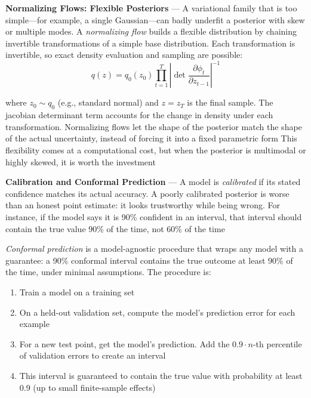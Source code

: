 \textbf{Normalizing Flows: Flexible Posteriors} --- A variational family that is
too simple—for example, a single Gaussian—can badly underfit a posterior with
skew or multiple modes. A \emph{normalizing flow} builds a flexible distribution
by chaining invertible transformations of a simple base distribution. Each transformation
is invertible, so exact density evaluation and sampling are possible:
\begin{equation}
  q(z) = q_{0}(z_{0}) \prod_{t=1}^{T}\left| \det \frac{\partial \phi_{t}}{\partial
  z_{t-1}}\right|^{-1}\label{eq:flow}
\end{equation}

where $z_{0}\sim q_{0}$ (e.g., standard normal) and $z = z_{T}$ is the final
sample. The jacobian determinant term accounts for the change in density under each
transformation. Normalizing flows let the shape of the posterior match the shape
of the actual uncertainty, instead of forcing it into a fixed parametric form This
flexibility comes at a computational cost, but when the posterior is multimodal
or highly skewed, it is worth the investment

\textbf{Calibration and Conformal Prediction} --- A model is \emph{calibrated}
if its stated confidence matches its actual accuracy. A poorly calibrated posterior
is worse than an honest point estimate: it looks trustworthy while being wrong. For
instance, if the model says it is 90\% confident in an interval, that interval
should contain the true value 90\% of the time, not 60\% of the time

\emph{Conformal prediction} is a model-agnostic procedure that wraps any model with
a guarantee: a 90\% conformal interval contains the true outcome at least 90\%
of the time, under minimal assumptions. The procedure is:

\begin{enumerate}
  \item Train a model on a training set

  \item On a held-out validation set, compute the model's prediction error for
    each example

  \item For a new test point, get the model's prediction. Add the $0.9 \cdot n$-th
    percentile of validation errors to create an interval

  \item This interval is guaranteed to contain the true value with probability at
    least 0.9 (up to small finite-sample effects)
\end{enumerate}

